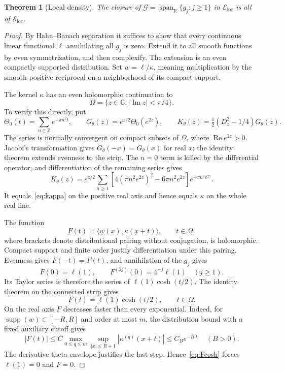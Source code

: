 \documentclass[11pt,a4paper]{article}
\numberwithin{equation}{section}
\newtheorem{theorem}{Theorem}[section]
\theoremstyle{definition}
\theoremstyle{remark}
\newcommand{\R}{\mathbb R}
\newcommand{\C}{\mathbb C}
\newcommand{\supp}{\operatorname{supp}}
\newcommand{\ip}[2]{\langle #1,#2\rangle}
\newcommand{\Eloc}{\mathcal E_{\mathrm{loc}}}
\begin{document}
\begin{theorem}[Local density]\label{thm:density}
The closure of $\mathcal G=\operatorname{span}_{\R}\{g_j:j\ge1\}$ in $\Eloc$ is all of $\Eloc$.
\end{theorem}
\begin{proof}
By Hahn--Banach separation it suffices to show that every continuous linear functional $\ell$ annihilating all $g_j$ is zero. Extend it to all smooth functions by even symmetrization, and then complexify. The extension is an even compactly supported distribution. Set $w=\ell/\kappa$, meaning multiplication by the smooth positive reciprocal on a neighborhood of its compact support.

The kernel $\kappa$ has an even holomorphic continuation to
\[
 \Omega=\{z\in\C:|\operatorname{Im}z|<\pi/4\}.
\]
To verify this directly, put
\[
 \Theta_0(t)=\sum_{n\in\mathbb Z}e^{-\pi n^2t},\qquad
 G_\theta(z)=e^{z/2}\Theta_0(e^{2z}),\qquad
 K_\theta(z)=\tfrac12(D_z^2-1/4)G_\theta(z).
\]
The series is normally convergent on compact subsets of $\Omega$, where $\operatorname{Re}e^{2z}>0$. Jacobi's transformation \cite[Eq.~20.7.32]{DLMF} gives $G_\theta(-x)=G_\theta(x)$ for real $x$; the identity theorem extends evenness to the strip. The $n=0$ term is killed by the differential operator, and differentiation of the remaining series gives
\[
 K_\theta(z)=e^{z/2}\sum_{n\ge1}
  [4(\pi n^2e^{2z})^2-6\pi n^2e^{2z}]e^{-\pi n^2e^{2z}}.
\]
It equals~\eqref{eq:kappa} on the positive real axis and hence equals $\kappa$ on the whole real line.

The function
\[
 F(t)=\ip{w(x)}{\kappa(x+t)},\qquad t\in\Omega,
\]
where brackets denote distributional pairing without conjugation, is holomorphic. Compact support and finite order justify differentiation under this pairing. Evenness gives $F(-t)=F(t)$, and annihilation of the $g_j$ gives
\[
 F(0)=\ell(1),\qquad F^{(2j)}(0)=4^{-j}\ell(1)\quad(j\ge1).
\]
Its Taylor series is therefore the series of $\ell(1)\cosh(t/2)$. The identity theorem on the connected strip gives
\begin{equation}\label{eq:Fcosh}
 F(t)=\ell(1)\cosh(t/2),\qquad t\in\Omega.
\end{equation}
On the real axis $F$ decreases faster than every exponential. Indeed, for $\supp(w)\subset[-R,R]$ and order at most $m$, the distribution bound with a fixed auxiliary cutoff gives
\[
 |F(t)|\le C\max_{0\le q\le m}\sup_{|x|\le R+1}|\kappa^{(q)}(x+t)|
       \le C_Be^{-B|t|}\quad(B>0).
\]
The derivative theta envelope justifies the last step. Hence~\eqref{eq:Fcosh} forces $\ell(1)=0$ and $F=0$.


\end{proof}
\end{document}
